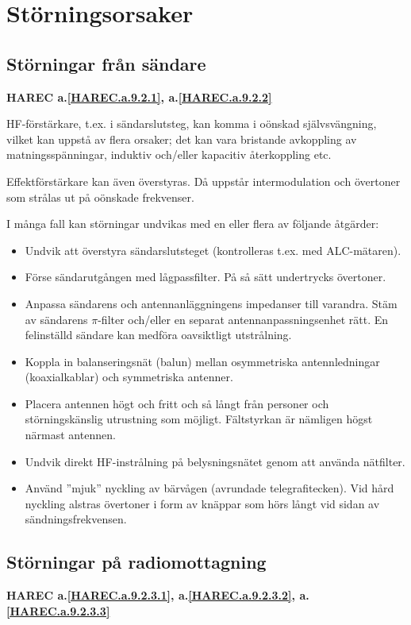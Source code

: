 \section{Störningsorsaker}

\subsection{Störningar från sändare}
\textbf{
HAREC a.\ref{HAREC.a.9.2.1}\label{myHAREC.a.9.2.1},
 a.\ref{HAREC.a.9.2.2}\label{myHAREC.a.9.2.2}
}

HF-förstärkare, t.ex. i sändarslutsteg, kan komma i oönskad självsvängning,
vilket kan uppstå av flera orsaker; det kan vara bristande avkoppling av
matningsspänningar, induktiv och/eller kapacitiv återkoppling etc.

Effektförstärkare kan även överstyras. Då uppstår intermodulation och övertoner
som strålas ut på oönskade frekvenser.

I många fall kan störningar undvikas med en eller flera av följande åtgärder:
\begin{itemize}
\item Undvik att överstyra sändarslutsteget (kontrolleras t.ex. med
  ALC-mätaren).
\item Förse sändarutgången med lågpassfilter.  På så sätt undertrycks
  övertoner.
\item Anpassa sändarens och antennanläggningens impedanser till
  varandra. Stäm av sändarens \(\pi\)-filter och/eller en separat
  antennanpassningsenhet rätt. En felinställd sändare kan medföra
  oavsiktligt utstrålning.
\item Koppla in balanseringsnät (balun) mellan osymmetriska
  antennledningar (koaxialkablar) och symmetriska antenner.
\item Placera antennen högt och fritt och så långt från personer och
  störningskänslig utrustning som möjligt. Fältstyrkan är nämligen
  högst närmast antennen.
\item Undvik direkt HF-instrålning på belysningsnätet genom att
  använda nätfilter.
\item Använd ''mjuk'' nyckling av bärvågen (avrundade
  telegrafitecken). Vid hård nyckling alstras övertoner i form av
  knäppar som hörs långt vid sidan av sändningsfrekvensen.
\end{itemize}

\subsection{Störningar på radiomottagning}
\textbf{
HAREC a.\ref{HAREC.a.9.2.3.1}\label{myHAREC.a.9.2.3.1},
 a.\ref{HAREC.a.9.2.3.2}\label{myHAREC.a.9.2.3.2},
 a.\ref{HAREC.a.9.2.3.3}\label{myHAREC.a.9.2.3.3}
}

